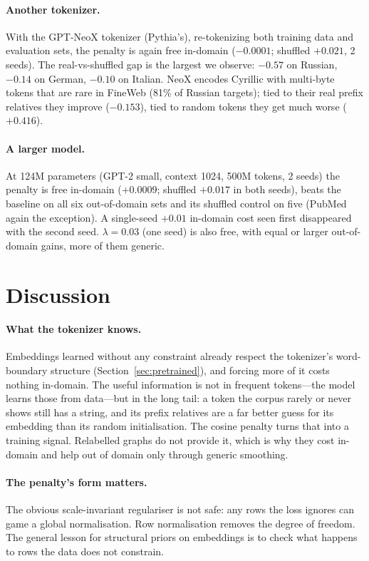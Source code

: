 \documentclass[11pt]{article}
\begin{document}
\paragraph{Another tokenizer.} With the GPT-NeoX tokenizer (Pythia's), re-tokenizing
both training data and evaluation sets, the penalty is again free in-domain
($-0.0001$; shuffled $+0.021$, 2 seeds). The real-vs-shuffled gap is the largest we
observe: $-0.57$ on Russian, $-0.14$ on German, $-0.10$ on Italian. NeoX encodes
Cyrillic with multi-byte tokens that are rare in FineWeb (81\% of Russian targets);
tied to their real prefix relatives they improve ($-0.153$), tied to random tokens
they get much worse ($+0.416$).

\paragraph{A larger model.} At 124M parameters (GPT-2 small, context 1024, 500M
tokens, 2 seeds) the penalty is free in-domain ($+0.0009$; shuffled $+0.017$ in both
seeds), beats the baseline on all six out-of-domain sets and its shuffled control on
five (PubMed again the exception). A single-seed $+0.01$ in-domain cost seen first
disappeared with the second seed. $\lambda=0.03$ (one seed) is also free, with equal
or larger out-of-domain gains, more of them generic.

\section{Discussion}

\paragraph{What the tokenizer knows.} Embeddings learned without any constraint
already respect the tokenizer's word-boundary structure (Section~\ref{sec:pretrained}),
and forcing more of it costs nothing in-domain. The useful information is not in
frequent tokens---the model learns those from data---but in the long tail: a token
the corpus rarely or never shows still has a string, and its prefix relatives are a
far better guess for its embedding than its random initialisation. The cosine
penalty turns that into a training signal. Relabelled graphs do not provide it, which
is why they cost in-domain and help out of domain only through generic smoothing.

\paragraph{The penalty's form matters.} The obvious scale-invariant regulariser is
not safe: any rows the loss ignores can game a global normalisation. Row
normalisation removes the degree of freedom. The general lesson for structural priors
on embeddings is to check what happens to rows the data does not constrain.
\end{document}
